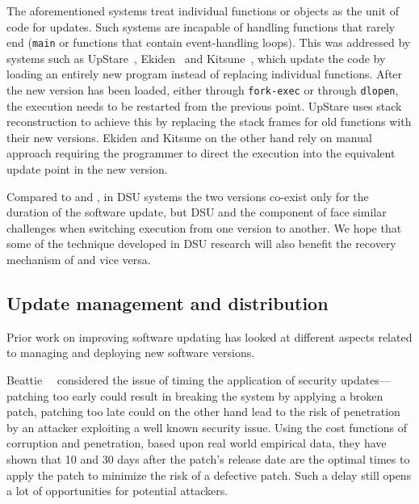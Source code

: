 The aforementioned systems treat individual functions or objects as the unit of
code for updates. Such systems are incapable of handling functions that rarely
end (\eg \lstinline`main` or functions that contain event-handling loops). This
was addressed by systems such as UpStare~\cite{upstare}, Ekiden~\cite{ekiden}
and Kitsune~\cite{kitsune}, which update the code by loading an entirely new
program instead of replacing individual functions. After the new version has
been loaded, either through \lstinline`fork-exec` or through
\lstinline`dlopen`, the execution needs to be restarted from the previous
point. UpStare uses stack reconstruction to achieve this by replacing the stack
frames for old functions with their new versions. Ekiden and Kitsune on the
other hand rely on manual approach requiring the programmer to direct the
execution into the equivalent update point in the new version.


Compared to \mx and \varan, in DSU systems the two versions co-exist only for
the duration of the software update, but DSU and the \rem component of \mx face
similar challenges when switching execution from one version to another.  We
hope that some of the technique developed in DSU research will also benefit the
recovery mechanism of \mx and vice versa.


\subsection{Update management and distribution}

Prior work on improving software updating has looked at different aspects
related to managing and deploying new software versions.

Beattie~\etal~\cite{beattie2002} considered the issue of timing the
application of security updates---patching too early could result in breaking
the system by applying a broken patch, patching too late could on the other
hand lead to the risk of penetration by an attacker exploiting a well known
security issue. Using the cost functions of corruption and penetration, based
upon real world empirical data, they have shown that 10 and 30 days after the
patch's release date are the optimal times to apply the patch to minimize the
risk of a defective patch.  Such a delay still opens a lot of opportunities for
potential attackers.

